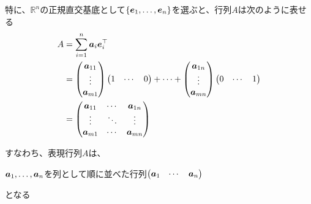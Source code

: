\documentclass[../../../topic_linear-algebra]{subfiles}
\begin{document}
特に、$\mathbb{R}^n$の正規直交基底として$\{\vb*{e}_1,\ldots,\vb*{e}_n\}$を選ぶと、行列$A$は次のように表せる
\begin{align*}
  A & = \sum_{i=1}^n \vb*{a}_i \vb*{e}_i^\top                               \\
    & = \begin{pmatrix}
          \vb*{a}_{11} \\
          \vdots       \\
          \vb*{a}_{m1}
        \end{pmatrix} \begin{pmatrix}
                        1 & \cdots & 0 \\
                      \end{pmatrix} + \cdots + \begin{pmatrix}
                                                 \vb*{a}_{1n} \\
                                                 \vdots       \\
                                                 \vb*{a}_{mn}
                                               \end{pmatrix} \begin{pmatrix}
                                                               0 & \cdots & 1
                                                             \end{pmatrix} \\
    & = \begin{pmatrix}
          \vb*{a}_{11} & \cdots & \vb*{a}_{1n} \\
          \vdots       & \ddots & \vdots       \\
          \vb*{a}_{m1} & \cdots & \vb*{a}_{mn}
        \end{pmatrix}
\end{align*}

\br

すなわち、表現行列$A$は、
\begin{shaded}
  $\vb*{a}_1,\ldots,\vb*{a}_n$を列として順に並べた行列$\begin{pmatrix}  \vb*{a}_1 & \cdots & \vb*{a}_n\end{pmatrix}$
\end{shaded}
となる
\end{document}
